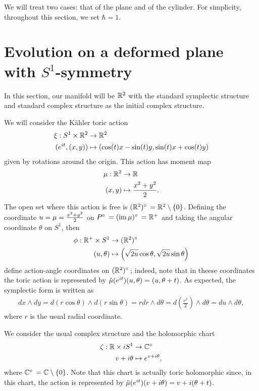 \documentclass[notas.tex]{subfiles}
\begin{document}
We will treat two cases: that of the plane and of the cylinder. For simplicity, throughout this section, we set $\hbar = 1$. 

\section{Evolution on a deformed plane with $S^1$-symmetry} \label{sec_plane}
In this section, our manifold will be $\mathbb{R}^2$ with the standard symplectic structure and standard complex structure as the initial complex structure.

We will consider the Kähler toric action 
\begin{align*}
	\xi: S^1 \times \mathbb{R}^2 &\to \mathbb{R}^2 \\
	(e^{it}, (x, y)) &\mapsto (\cos (t) x - \sin(t) y, \sin(t) x + \cos(t) y) 
\end{align*}
given by rotations around the origin. This action has moment map
\begin{align*}
	\mu: \mathbb{R}^2 &\to \mathbb{R} \\
	(x, y) &\mapsto \frac{x^2 + y^2}{2}.
\end{align*}
The open set where this action is free is $(\reals^2)^\circ = \reals^2 \setminus \{0\}$. Defining the coordinate $u = \mu = \frac{x^2 + y^2}{2}$ on $P^\circ = (\image \mu)^\circ = \reals^+$ and taking the angular coordinate $\theta$ on $S^1$, then 
\begin{align*}
	\phi: \reals^+ \times S^1 &\to (\reals^2)^\circ \\
	(u, \theta) &\mapsto \left (\sqrt{2u} \cos \theta, \sqrt{2u} \sin \theta \right )
\end{align*}
define action-angle coordinates on $(\reals^2)^\circ$; indeed, note that in theese coordinates the toric action is represented by  $\hat {\mu}(e^{it})(u, \theta) = (u, \theta + t)$. As expected, the symplectic form is written as
\begin{align*}
	dx \wedge dy = d (r \cos \theta) \wedge d(r \sin \theta) = r dr \wedge d \theta = d\left( \frac{r^2}{2} \right) \wedge d \theta = du \wedge d\theta,
\end{align*}
where $r$ is the usual radial coordinate. 

We consider the usual complex structure and the holomorphic chart 
\begin{align*}
	\zeta: \reals \times iS^1 &\to \cmplx^\circ \\
	v + i\theta &\mapsto e^{v + i\theta},
\end{align*}
where $\cmplx^\circ = \cmplx \setminus \{0\}$. Note that this chart is actually toric holomorphic since, in this chart, the action is represented by $\tilde {\mu}(e^{it})(v + i\theta) = v + i(\theta + t)$. 
\end{document}
